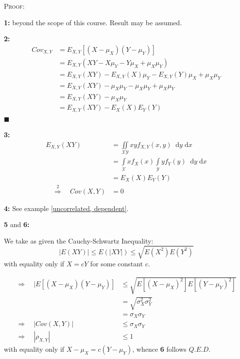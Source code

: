 \documentclass[12pt,a4paper]{article}
\newcommand{\imply}{\quad\Rightarrow\quad}
\newcommand{\diff}{\;\mathrm{d}}
\begin{document}
\noindent\textsc{Proof:}\par\vspace{1cm}

\noindent\textbf{1: } beyond the scope of this course. Result may be assumed.

\noindent\textbf{2: } \begin{align*}
Cov_{X,Y} &= E_{{X,Y}}[(X-\mu_X)(Y-\mu_Y)]\\
&= E_{{X,Y}}(XY - X\mu_Y - Y\mu_X + \mu_X\mu_Y)\\
&= E_{{X,Y}}(XY) - E_{X,Y}(X)\mu_Y - E_{{X,Y}}(Y)\mu_X + \mu_X\mu_Y\\
&= E_{{X,Y}}(XY) - \mu_X\mu_Y - \mu_X\mu_Y + \mu_X\mu_Y\\
&= E_{{X,Y}}(XY) - \mu_X\mu_Y\\
&= E_{{X,Y}}(XY) - E_{X}(X)E_{Y}(Y)
\end{align*}
\hfill$\blacksquare$

\noindent\textbf{3: }
\begin{align*}
E_{X,Y}(XY) &= \iint\limits_{\mathcal{X}\mathcal{Y}} xyf_{X,Y}(x,y)\;\diff y\diff x\\
&= \int\limits_{\mathcal{X}} xf_X(x) \int\limits_{\mathcal{Y}} yf_Y(y) \;\diff y \diff x\\
&= E_X(X)E_Y(Y)\\
\overset{2}{\imply} Cov(X,Y) &= 0
\end{align*}

\noindent\textbf{4: } See example \ref{uncorrelated, dependent}.

\noindent\textbf{5} and \textbf{6: }

\noindent We take as given the Cauchy-Schwartz Inequality:
$$|E(XY)| \leq E(|XY|) \leq \sqrt{E(X^2)E(Y^2)}$$
with equality only if $X = cY$ for some constant $c$.

\begin{align*}
\Rightarrow\quad |E[(X-\mu_X)(Y-\mu_Y)] &\leq \sqrt{E[(X-\mu_X)^2]E[(Y-\mu_Y)^2]}\\
&= \sqrt{\sigma_X^2\sigma_Y^2}\\
&= \sigma_X\sigma_Y\\
\Rightarrow \quad |Cov(X,Y)| &\leq \sigma_X\sigma_Y\\
\Rightarrow\quad |\rho_{X,Y}| &\leq 1
\end{align*}
with equality only if $X-\mu_X = c(Y-\mu_Y)$, whence \textbf{6} follows \hfill$Q.E.D.$
\end{document}
